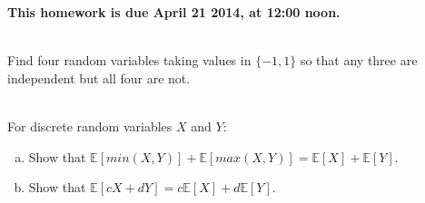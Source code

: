 \documentclass[]{article}
\newif\ifsolutions
\renewcommand{\answer}[1]{{\color{mydarkblue}\textbf{Solution:}#1}}
\begin{document}
\maketitle
{}
\vspace{0.5em}
{\Large{\textbf{This homework is due April 21 2014, at 12:00 noon.}}}

\begin{qunlist}

\\
Find four random variables taking values in $\{-1,1\}$ so that any three are independent but all four are not.

\ifsolutions{ \answer{
Let $X_1,X_2,X_3,X_4$ be i.i.d random variables with $P(X_i=1)=P(X_i=-1)=1/2$. Let $X_4=X_1X_2X_3$. Check that $X_1,X_2,X_3,X_4$ are four random variables such that any three are independent but all four are not. For example, they are not all independent because
\[
P(X_1=1,X_2=1,X_3=1,X_4=1)=1/8 \neq
P(X_1=1)P(X_2=1)P(X_3=1)P(X_4=1)
\]
}}
\fi

 \\ For discrete random variables $X$ and $Y$:

\begin{enumerate}[a)]
\qpart
\item Show that $\mathbb{E}[min(X,Y)] + \mathbb{E}[max(X,Y)] = \mathbb{E}[X] + \mathbb{E}[Y]$.


\qpart
\item Show that $\mathbb{E}[cX + dY] = c\mathbb{E}[X] + d \mathbb{E}[Y]$.

\end{enumerate}


\end{qunlist}
\end{document}
